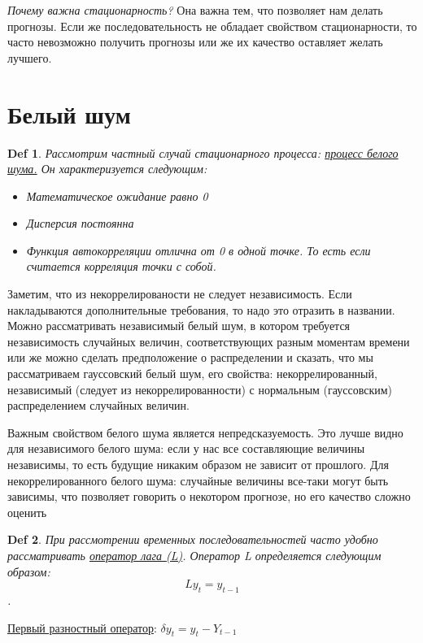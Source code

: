\documentclass{article}
\newtheorem*{definition}{Def}
\begin{document}
\textit{Почему важна стационарность?} Она важна тем, что позволяет нам делать прогнозы. Если же последовательность не обладает свойством стационарности, то часто невозможно получить прогнозы или же их качество оставляет желать лучшего. 

\section{Белый шум}

\begin{definition} \label{d7} 
Рассмотрим частный случай стационарного процесса: \underline{процесс белого шума.} Он характеризуется следующим: 
\begin{itemize}
    \item Математическое ожидание равно 0
    \item Дисперсия постоянна 
    \item Функция автокорреляции отлична от 0 в одной точке. То есть если считается корреляция точки с собой.
\end{itemize}
\end{definition}

Заметим, что из некоррелированости не следует независимость. Если накладываются дополнительные требования, то надо это отразить в названии. Можно рассматривать независимый белый шум, в котором требуется независимость случайных величин, соответствующих разным моментам времени или же можно сделать предположение о распределении и сказать, что мы рассматриваем гауссовский белый шум, его свойства: некоррелированный, независимый (следует из некоррелированности) с нормальным (гауссовским) распределением случайных величин. 

Важным свойством белого шума является непредсказуемость. Это лучше видно для независимого белого шума: если у нас все составляющие величины независимы, то есть будущие никаким образом не зависит от прошлого. Для некоррелированного белого шума: случайные величины все-таки могут быть зависимы, что позволяет говорить о некотором прогнозе, но его качество сложно оценить 

\begin{definition} \label{d8} 
При рассмотрении временных последовательностей часто удобно рассматривать \underline{оператор лага (L)}. Оператор L определяется следующим образом: $$Ly_t = y_{t-1}$$. 
\end{definition}

\underline{Первый разностный оператор}: $\delta y_t = y_t - Y_{t-1}$
\end{document}
